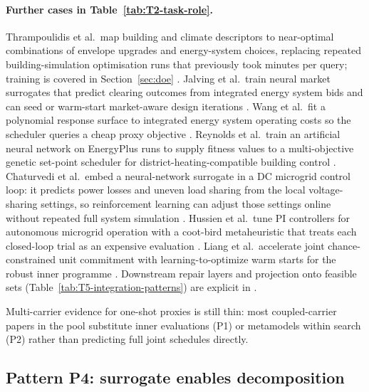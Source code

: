 \paragraph{Further cases in Table~\ref{tab:T2-task-role}.}
Thrampoulidis et al.\ map building and climate descriptors to
near-optimal combinations of envelope upgrades and energy-system
choices, replacing repeated building-simulation optimisation runs that
previously took minutes per query; training is covered in
Section~\ref{sec:doe} \cite{Thrampoulidis2021}.
Jalving et al.\ train neural market surrogates that predict clearing
outcomes from integrated energy system bids and can seed or warm-start
market-aware design iterations \cite{Jalving2023}.
Wang et al.\ fit a polynomial response surface to integrated energy
system operating costs so the scheduler queries a cheap proxy objective
\cite{Wang2020202933}.
Reynolds et al.\ train an artificial neural network on EnergyPlus runs
to supply fitness values to a multi-objective genetic set-point scheduler
for district-heating-compatible building control \cite{Reynolds2017704}.
Chaturvedi et al.\ embed a neural-network surrogate in a DC microgrid
control loop: it predicts power losses and uneven load sharing from the
local voltage-sharing settings, so reinforcement learning can adjust
those settings online without repeated full system simulation
\cite{Chaturvedi2024149}. Hussien et al.\ tune PI controllers for autonomous microgrid operation
with a coot-bird metaheuristic that treats each closed-loop trial as
an expensive evaluation \cite{Hussien20226442}.
Liang et al.\ accelerate joint chance-constrained unit commitment with
learning-to-optimize warm starts for the robust inner programme
\cite{Liang20246508}.
Downstream repair layers and projection onto feasible sets
(Table~\ref{tab:T5-integration-patterns}) are explicit in
\cite{Chen20244723,Liang20246508,Thrampoulidis2021}.

Multi-carrier evidence for one-shot proxies is still thin: most
coupled-carrier papers in the pool substitute inner evaluations (P1)
or metamodels within search (P2) rather than predicting full joint
schedules directly.

\subsection{Pattern P4: surrogate enables decomposition}
\label{sec:int:decomp}

